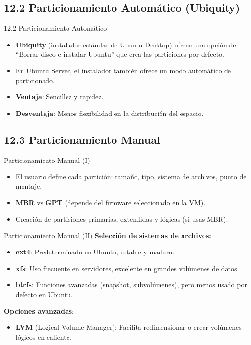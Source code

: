 \documentclass{beamer}
\begin{document}
\subsection{12.2 Particionamiento Automático (Ubiquity)}
\begin{frame}{12.2 Particionamiento Automático}
    \begin{itemize}
        \item \textbf{Ubiquity} (instalador estándar de Ubuntu Desktop) ofrece una opción de “Borrar disco e instalar Ubuntu” que crea las particiones por defecto.
        \item En Ubuntu Server, el instalador también ofrece un modo automático de particionado.
        \item \textbf{Ventaja}: Sencillez y rapidez.
        \item \textbf{Desventaja}: Menos flexibilidad en la distribución del espacio.
    \end{itemize}
\end{frame}

\subsection{12.3 Particionamiento Manual}
\begin{frame}{Particionamiento Manual (I)}
    \begin{itemize}
        \item El usuario define cada partición: tamaño, tipo, sistema de archivos, punto de montaje.
        \item \textbf{MBR} vs \textbf{GPT} (depende del firmware seleccionado en la VM).
        \item Creación de particiones primarias, extendidas y lógicas (si usas MBR).
    \end{itemize}
\end{frame}

\begin{frame}{Particionamiento Manual (II)}
    \textbf{Selección de sistemas de archivos:}
    \begin{itemize}
        \item \textbf{ext4}: Predeterminado en Ubuntu, estable y maduro.
        \item \textbf{xfs}: Uso frecuente en servidores, excelente en grandes volúmenes de datos.
        \item \textbf{btrfs}: Funciones avanzadas (snapshot, subvolúmenes), pero menos usado por defecto en Ubuntu.
    \end{itemize}
    \vspace{0.2cm}
    \textbf{Opciones avanzadas}:
    \begin{itemize}
        \item \textbf{LVM} (Logical Volume Manager): Facilita redimensionar o crear volúmenes lógicos en caliente.
    \end{itemize}
\end{frame}
\end{document}
